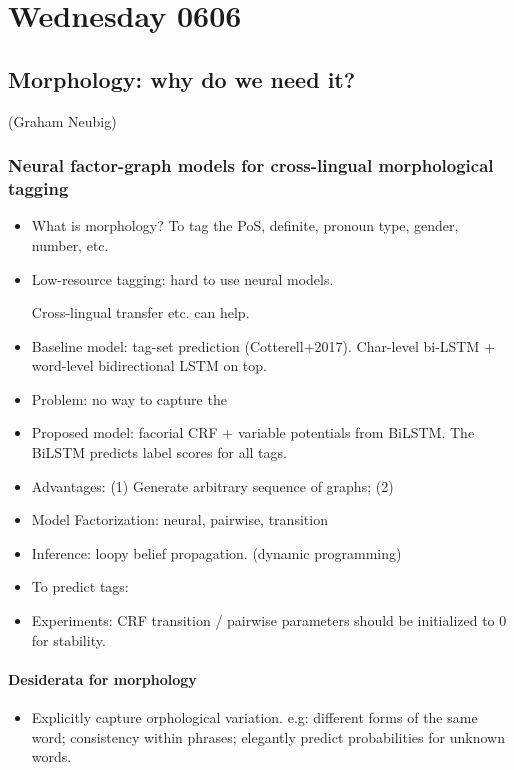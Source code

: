 \section{Wednesday 0606}

\subsection{Morphology: why do we need it? } (Graham Neubig)

\subsubsection{Neural factor-graph models for cross-lingual morphological tagging}
\begin{itemize}
	\item What is morphology? To tag the PoS, definite, pronoun type, gender, number, etc.
	\item Low-resource tagging: hard to use neural models.
	
	Cross-lingual transfer etc. can help.
	
	\item Baseline model: tag-set prediction (Cotterell+2017). Char-level bi-LSTM + word-level bidirectional LSTM on top.
	
	\item Problem: no way to capture the 
	
	\item Proposed model: facorial CRF + variable potentials from BiLSTM. The BiLSTM predicts label scores for all tags. 
	
	\item Advantages: (1) Generate arbitrary sequence of graphs; (2) 
	
	\item Model Factorization: neural, pairwise, transition
	
	\item Inference: loopy belief propagation. (dynamic programming)
	
	\item To predict tags: 
	
	\item Experiments: CRF transition / pairwise parameters should be initialized to 0 for stability.
\end{itemize}

\paragraph{Desiderata for morphology}
\begin{itemize}
	\item Explicitly capture orphological variation. e.g: different forms of the same word; consistency within phrases; elegantly predict probabilities for unknown words. 
\end{itemize}